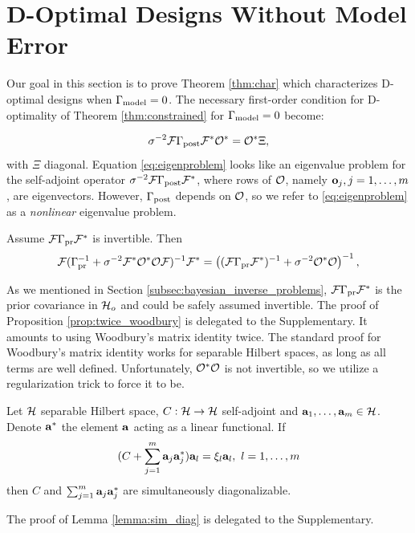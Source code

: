 \section{D-Optimal Designs Without Model Error}\label{section:vanishing}
Our goal in this section is to prove Theorem \ref{thm:char} which
characterizes D-optimal designs when $\Gamma_{\textup{model}} = 0$. The necessary
first-order condition for D-optimality of Theorem
\ref{thm:constrained} for $\Gamma_{\textup{model}} = 0$ become:

\begin{equation}\label{eq:eigenproblem}
  \sigma^{-2}\fwd \postcov \fwd^* \obs^* = \obs^* \Xi,
\end{equation}
with $\Xi$ diagonal. Equation \eqref{eq:eigenproblem} looks like an
eigenvalue problem for the self-adjoint operator $\sigma^{-2}\mathcal{F}
\Gamma_{\textup{post}} \mathcal{F}^*$, where rows of $\mathcal{O}$, namely $\mathbf{o}_j,j=1,\dots, m$,
are eigenvectors. However, $\Gamma_{\textup{post}}$ depends on $\mathcal{O}$, so we refer
to \eqref{eq:eigenproblem} as a \emph{nonlinear} eigenvalue problem.

\begin{proposition}\label{prop:twice_woodbury}
  Assume $\mathcal{F} \Gamma_{\textup{pr}} \mathcal{F}^*$ is invertible. Then
  \begin{align*}
    \begin{split}
      \fwd( \prcov^{-1} + \sigma^{-2}  \fwd^* \obs^* \obs \fwd )^{-1} \fwd^* 
      = \left ( (\fwd\prcov\fwd^*)^{-1} + \sigma^{-2}  \obs^* \obs \right )^{-1},
    \end{split}
  \end{align*}  
\end{proposition}

As we mentioned in Section \ref{subsec:bayesian_inverse_problems},
$\mathcal{F} \Gamma_{\textup{pr}} \mathcal{F}^*$ is the prior covariance in $\mathcal{H}_o$ and could be
safely assumed invertible. The proof of Proposition
\ref{prop:twice_woodbury} is delegated to the Supplementary. It
amounts to using Woodbury's matrix identity twice. The standard proof
for Woodbury's matrix identity works for separable Hilbert spaces, as
long as all terms are well defined. Unfortunately, $\mathcal{O}^*\mathcal{O}$ is not
invertible, so we utilize a regularization trick to force it to be.

\begin{lemma}\label{lemma:sim_diag}
  Let $\mathcal{H}$ separable Hilbert space, $C:\mathcal{H} \to \mathcal{H}$ self-adjoint
  and $\mathbf{a}_1,\dots,\mathbf{a}_m \in \mathcal{H}$. Denote $\mathbf{a}^*$ the element
  $\mathbf{a}$ acting as a linear functional. If
  \begin{equation*}
   (C + \sum_{j=1}^m \func_j\func_j^*) \func_l = \xi_l \func_l,\ l = 1,\dots,m
  \end{equation*}
  then $C$ and $\sum_{j=1}^m \mathbf{a}_j \mathbf{a}_j^*$ are simultaneously
  diagonalizable.
\end{lemma}
The proof of Lemma \ref{lemma:sim_diag} is delegated to the
Supplementary.

